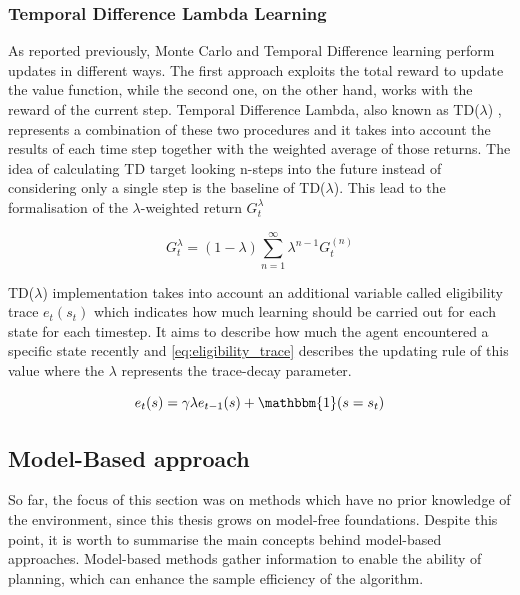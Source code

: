 \subsubsection{Temporal Difference Lambda Learning}

As reported previously, Monte Carlo and Temporal Difference learning perform updates in different ways. The first approach exploits the total reward to update the value function, while the second one, on the other hand, works with the reward of the current step. Temporal Difference Lambda, also known as TD($\lambda$) \cite[Chapter 7,12]{sutton2018reinforcement}, represents a combination of these two procedures and it takes into account the results of each time step together with the weighted average of those returns.
The idea of calculating TD target looking n-steps into the future instead of considering only a single step is the baseline of TD($\lambda$). This lead to the formalisation of the $\lambda$-weighted return $G_t^\lambda$

\begin{equation}\label{eq:lambdaG}
G_t^\lambda = (1-\lambda)\sum_{n=1}^{\infty}\lambda^{n-1}G_t^{(n)}
\end{equation}

TD($\lambda$) implementation takes into account an additional variable called eligibility trace $e_t(s_t)$ which indicates how much learning should be carried out for each state for each timestep. It aims to describe how much the agent encountered a specific state recently and \vref{eq:eligibility_trace} describes the updating rule of this value where the $\lambda$ represents the trace-decay parameter.

\begin{equation}\label{eq:eligibility_trace}
e_t(s) = \gamma \lambda e_{t-1}(s) + \mathbbm{1}(s = s_t)
\end{equation}

\subsection{Model-Based approach}


So far, the focus of this section was on methods which have no prior knowledge of the environment, since this thesis grows on model-free foundations.
Despite this point, it is worth to summarise the main concepts behind model-based approaches.
Model-based methods gather information to enable the ability of planning, which can enhance the sample efficiency of the algorithm. 


